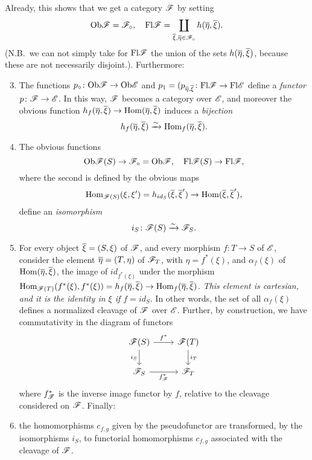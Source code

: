 Already, this shows that we get a category $\mathscr{F}$ by setting
\[\mathrm{Ob} \mathscr{F} = \mathscr{F}_\circ, \quad \mathrm{Fl} \mathscr{F} = \coprod_{\overline \xi, \overline \eta \in \mathscr{F}_\circ} h(\overline \eta, \overline \xi).\]
(N.B.\ we can not simply take for $\mathrm{Fl} \mathscr{F}$ the union of the sets $h (\overline \eta, \overline \xi)$, because these are not necessarily disjoint.).
Furthermore:
\begin{enumerate}
    \setcounter{enumi}{2}
    \item The functions $p_\circ \colon \mathrm{Ob} \mathscr{F} \to \mathrm{Ob} \mathscr{E}$ and $p_1 = (p_{\overline \eta, \overline \xi} \colon \mathrm{Fl}\mathscr{F} \to \mathrm{Fl} \mathscr{E}$ define a \emph{functor} $p \colon \mathscr{F} \to \mathscr{E}$. In this way, $\mathscr{F}$ becomes a category over $\mathscr{E}$, and moreover the obvious function $h_f (\overline \eta, \overline \xi) \to \mathrm{Hom} (\overline \eta, \overline \xi)$ induces a \emph{bijection}
    \[h_f(\overline \eta, \overline \xi) \xrightarrow{\sim} \mathrm{Hom}_f(\overline \eta, \overline \xi).\]
    \item The obvious functions
    \[\mathrm{Ob} \mathscr{F}(S) \to \mathscr{F}_\circ = \mathrm{Ob} \mathscr{F}, \quad \mathrm{Fl} \mathscr{F}(S) \to \mathrm{Fl}\mathscr{F},\]
    where the second is defined by the obvious maps
    \[\mathrm{Hom}_{\mathscr{F}(S)} (\xi, \xi') = h_{id_S}(\overline \xi,\overline \xi') \to \mathrm{Hom}(\overline \xi, \overline \xi'),\]
    define an \emph{isomorphism}
    \[i_S \colon \mathscr{F}(S) \xrightarrow{\sim} \mathscr{F}_S.\]
    \item {}For every object $\overline \xi = (S, \xi)$ of $\mathscr{F}$, and every morphism $f \colon T \to S$ of $\mathscr{E}$, consider the element $\overline \eta = (T, \eta)$ of $\mathscr{F}_T$, 
    with $\eta = f^\ast (\xi)$, and $\alpha_f (\xi)$ of $\mathrm{Hom} (\overline \eta, \overline \xi)$, the image of $id_{f^\ast (\xi)}$ under the morphism $\mathrm{Hom}_{\mathscr{F} (T)} (f^\ast(\xi), f ^\ast(\xi)) = h_f (\overline \eta, \overline \xi) \to \mathrm{Hom}_f (\overline \eta, \overline \xi)$.
    \emph{This element is cartesian, and it is the identity in $\xi$ if $f = id_S$}.
    In other words, the set of all $\alpha_f (\xi)$ defines a normalized cleavage of $\mathscr{F}$ over $\mathscr{E}$. 
    Further, by construction, we have commutativity in the diagram of functors
    \[
    \begin{tikzcd}
        \F(S)
        \arrow[r, "f^\ast"]
        \arrow[d, "i_S", swap]
        &
        \F(T)
        \arrow[d, "i_T"]
        \\
        \F_S
        \arrow[r, "f^\ast_\F", swap]
        &
        \F_T
    \end{tikzcd}\]
    where $f^\ast_{\mathscr{F}}$ is the inverse image functor by $f$, relative to the cleavage considered on $\mathscr{F}$. Finally:
    \item the homomorphisms $c_{f, g}$ given by the pseudofunctor are transformed, by the isomorphisms $i_S$, to functorial homomorphisms $c_{f, g}$ associated with the cleavage of $\mathscr{F}$.
\end{enumerate}
